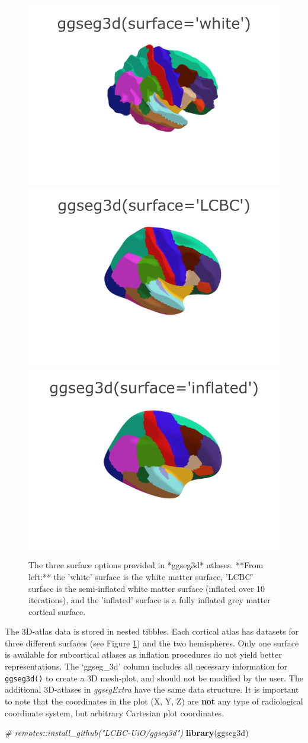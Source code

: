 \documentclass[fleqn,10pt]{wlpeerj} %
\newenvironment{Shaded}{\begin{snugshade}}{\end{snugshade}}
\newcommand{\CommentTok}[1]{\textcolor[rgb]{0.56,0.35,0.01}{\textit{#1}}}
\newcommand{\KeywordTok}[1]{\textcolor[rgb]{0.13,0.29,0.53}{\textbf{#1}}}
\newcommand{\NormalTok}[1]{#1}
\begin{document}
\begin{figure}[H]
\includegraphics[width=0.3\linewidth]{png/ggseg3d_white} \includegraphics[width=0.3\linewidth]{png/ggseg3d} \includegraphics[width=0.3\linewidth]{png/ggseg3d_inflated} \caption{The three surface options provided in *ggseg3d* atlases. **From left:** the 'white' surface is the white matter surface, 'LCBC' surface is the semi-inflated white matter surface (inflated over 10 iterations), and the 'inflated' surface is a fully inflated grey matter cortical surface.}\label{fig:ggseg3d-1-out}
\end{figure}

The 3D-atlas data is stored in nested tibbles.
Each cortical atlas has datasets for three different surfaces (see Figure \ref{fig:ggseg3d-1-out}) and the two hemispheres.
Only one surface is available for subcortical atlases as inflation procedures do not yield better representations.
The `ggseg\_3d' column includes all necessary information for \texttt{ggseg3d()} to create a 3D mesh-plot, and should not be modified by the user.
The additional 3D-atlases in \emph{ggsegExtra} have the same data structure.
It is important to note that the coordinates in the plot (X, Y, Z) are \textbf{not} any type of radiological coordinate system, but arbitrary Cartesian plot coordinates.

\small

\begin{Shaded}
\begin{Highlighting}[]
\CommentTok{\# remotes::install\_github("LCBC{-}UiO/ggseg3d")}
\KeywordTok{library}\NormalTok{(ggseg3d)}
\end{Highlighting}
\end{Shaded}
\end{document}
